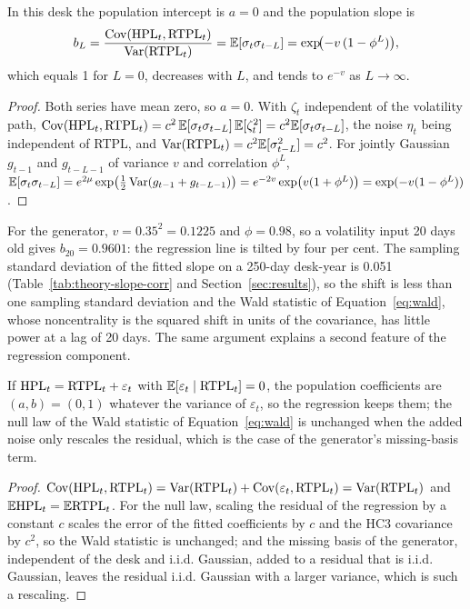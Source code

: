 \begin{proposition}
\label{prop:slope}
In this desk the population intercept is $a=0$ and the population slope is
\begin{equation}
b_L=\frac{\operatorname{Cov}(\mathrm{HPL}_t,\mathrm{RTPL}_t)}{\operatorname{Var}(\mathrm{RTPL}_t)}=\mathbb{E}[\sigma_t\sigma_{t-L}]=\exp\!\bigl(-v\,(1-\phi^{L})\bigr),
\label{eq:slope}
\end{equation}
which equals 1 for $L=0$, decreases with $L$, and tends to $e^{-v}$ as $L\to\infty$.
\end{proposition}

\begin{proof}
Both series have mean zero, so $a=0$.
With $\zeta_t$ independent of the volatility path, $\operatorname{Cov}(\mathrm{HPL}_t,\mathrm{RTPL}_t)=c^2\,\mathbb{E}[\sigma_t\sigma_{t-L}]\,\mathbb{E}[\zeta_t^2]=c^2\mathbb{E}[\sigma_t\sigma_{t-L}]$, the noise $\eta_t$ being independent of RTPL, and $\operatorname{Var}(\mathrm{RTPL}_t)=c^2\mathbb{E}[\sigma_{t-L}^2]=c^2$.
For jointly Gaussian $g_{t-1}$ and $g_{t-L-1}$ of variance $v$ and correlation $\phi^{L}$, $\mathbb{E}[\sigma_t\sigma_{t-L}]=e^{2\mu}\exp\bigl(\tfrac12\operatorname{Var}(g_{t-1}+g_{t-L-1})\bigr)=e^{-2v}\exp\bigl(v(1+\phi^{L})\bigr)=\exp(-v(1-\phi^{L}))$.
\end{proof}

For the generator, $v=0.35^2=0.1225$ and $\phi=0.98$, so a volatility input 20 days old gives $b_{20}=0.9601$: the regression line is tilted by four per cent.
The sampling standard deviation of the fitted slope on a 250-day desk-year is 0.051 (Table~\ref{tab:theory-slope-corr} and Section~\ref{sec:results}), so the shift is less than one sampling standard deviation and the Wald statistic of Equation~\eqref{eq:wald}, whose noncentrality is the squared shift in units of the covariance, has little power at a lag of 20 days.
The same argument explains a second feature of the regression component.

\begin{corollary}
\label{cor:noise}
If $\mathrm{HPL}_t=\mathrm{RTPL}_t+\varepsilon_t$ with $\mathbb{E}[\varepsilon_t\mid\mathrm{RTPL}_t]=0$, the population coefficients are $(a,b)=(0,1)$ whatever the variance of $\varepsilon_t$, so the regression keeps them; the null law of the Wald statistic of Equation~\eqref{eq:wald} is unchanged when the added noise only rescales the residual, which is the case of the generator's missing-basis term.
\end{corollary}

\begin{proof}
$\operatorname{Cov}(\mathrm{HPL}_t,\mathrm{RTPL}_t)=\operatorname{Var}(\mathrm{RTPL}_t)+\operatorname{Cov}(\varepsilon_t,\mathrm{RTPL}_t)=\operatorname{Var}(\mathrm{RTPL}_t)$ and $\mathbb{E}\mathrm{HPL}_t=\mathbb{E}\mathrm{RTPL}_t$.
For the null law, scaling the residual of the regression by a constant $c$ scales the error of the fitted coefficients by $c$ and the HC3 covariance by $c^2$, so the Wald statistic is unchanged; and the missing basis of the generator, independent of the desk and i.i.d. Gaussian, added to a residual that is i.i.d. Gaussian, leaves the residual i.i.d. Gaussian with a larger variance, which is such a rescaling.
\end{proof}

